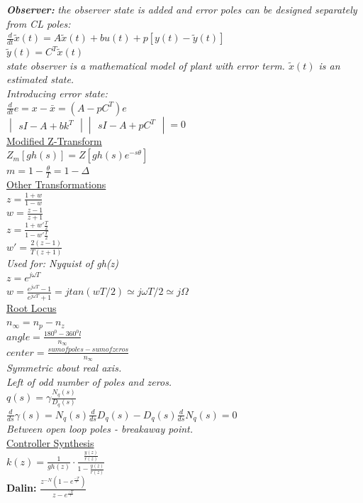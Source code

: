 \documentclass[a4paper, 10pt, titlepage]{article}
\begin{document}
\begin{paracol}{3}[]
\textbf{\textit{Observer:}} \textit{the observer state is added and error poles can be designed separately from CL poles:} \\
$\frac{d}{dt}\tilde{x}(t) = A\tilde{x}(t) + bu(t) + p[y(t)-\tilde{y}(t)]$\\
$\tilde{y}(t) = C^T\tilde{x}(t)$\\
\textit{state observer is a mathematical model of plant with error term. $\tilde{x}(t)$ is an estimated state.} \\
\textit{Introducing error state:} \\
$\frac{d}{dt}e = x - \bar{x} = (A-pC^T)e$ \\
$\begin{vmatrix}
sI-A+bk^T
\end{vmatrix}
\begin{vmatrix}
sI-A+pC^T
\end{vmatrix}
= 0
$ \\

\switchcolumn 
\underline{Modified Z-Transform} \\
$Z_m[gh(s)] = Z[gh(s)e^{-s\theta}]$\\
$m=1-\frac{\theta}{T}=1-\Delta$\\

\underline{Other Transformations} \\
$z=\frac{1+w}{1-w}$\\
$w=\frac{z-1}{z+1}$\\

$z=\frac{1+w'\frac{T}{2}}{1-w'\frac{T}{2}}$\\
$w'=\frac{2(z-1)}{T(z+1)}$\\
\textit{Used for: Nyquist of gh(z)}\\

$z=e^{j\omega T}$\\
$w=\frac{e^{j\omega T}-1}{e^{j\omega T}+1} = jtan(wT/2) \simeq j\omega T/2 \simeq j\Omega$\\

\underline{Root Locus} \\
$n_\infty = n_p - n_z$ \\
$angle = \frac{180^0 - 360^0l}{n_\infty}$ \\
$center = \frac{sum of poles - sum of zeros}{n_\infty}$ \\
\textit{Symmetric about real axis.}\\
\textit{Left of odd number of poles and zeros.}\\
$q(s)=\gamma \frac{N_q(s)}{D_q(s)}$\\
$\frac{d}{ds}\gamma(s) = N_q(s)\frac{d}{ds}D_q(s)-D_q(s)\frac{d}{ds}N_q(s)=0$\\
\textit{Between open loop poles - breakaway point.}\\

\underline{Controller Synthesis}\\
$k(z)=\frac{1}{gh(z)}\cdot \frac{\frac{y(z)}{r(z)}}{1-\frac{y(z)}{r(z)}}$\\
\textbf{Dalin:} $\frac{z^{-N}(1-e^{\frac{-T}{\tau}})}{z-e^{\frac{-T}{\tau}}}$\\

\end{paracol}
\end{document}
